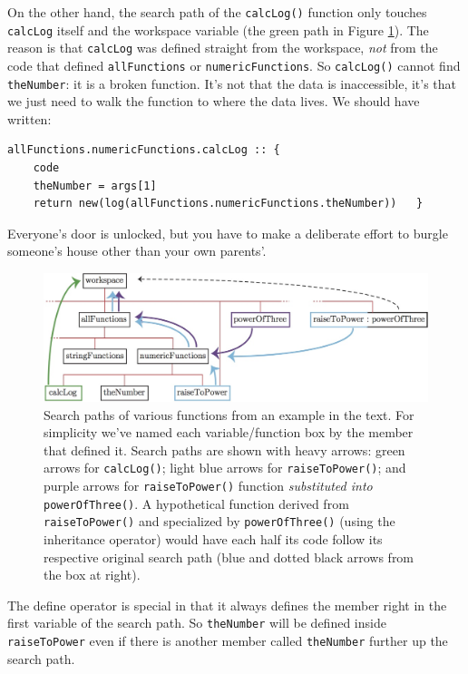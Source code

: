 \documentclass{article}
\newenvironment{code}{
       \begin{list}{}{
               \setlength{\leftmargin}{.4in}
               \setlength{\rightmargin}{0in}
               \setlength{\topsep}{.2in}
       }
       \small
       \item[] }
       { \end{list}   }
\begin{document}
On the other hand, the search path of the \verb#calcLog()# function only touches \verb#calcLog# itself and the workspace variable (the green path in Figure \ref{searchPaths}).  The reason is that \verb#calcLog# was defined straight from the workspace, \emph{not} from the code that defined \verb#allFunctions# or \verb#numericFunctions#.  So \verb#calcLog()# cannot find \verb#theNumber#:  it is a broken function.  It's not that the data is inaccessible, it's that we just need to walk the function to where the data lives.  We should have written:

\begin{code} \begin{verbatim}
allFunctions.numericFunctions.calcLog :: {
    code
    theNumber = args[1]
    return new(log(allFunctions.numericFunctions.theNumber))   }
\end{verbatim} \end{code}

\noindent Everyone's door is unlocked, but you have to make a deliberate effort to burgle someone's house other than your own parents'.

\begin{figure}
\centering
\includegraphics[width=\textwidth]{searchPaths}
\caption{Search paths of various functions from an example in the text.  For simplicity we've named each variable/function box by the member that defined it.  Search paths are shown with heavy arrows:  green arrows for \texttt{calcLog()}; light blue arrows for \texttt{raiseToPower()}; and purple arrows for \texttt{raiseToPower()} function \emph{substituted into} \texttt{powerOfThree()}.  A hypothetical function derived from \texttt{raiseToPower()} and specialized by \texttt{powerOfThree()} (using the inheritance operator) would have each half its code follow its respective original search path (blue and dotted black arrows from the box at right).}
\label{searchPaths}
\end{figure}

The define operator is special in that it always defines the member right in the first variable of the search path.  So \verb#theNumber# will be defined inside \verb#raiseToPower# even if there is another member called \verb#theNumber# further up the search path.
\end{document}
